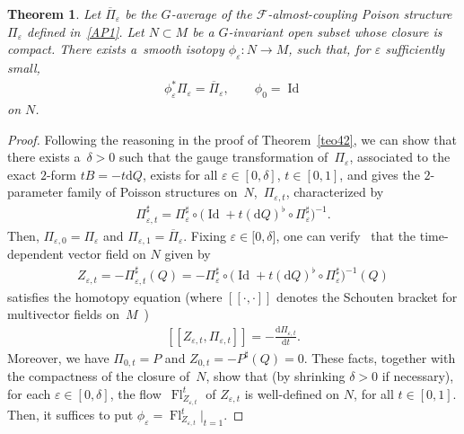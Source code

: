 \documentclass[pdftex]{sigma}
\numberwithin{equation}{section}
\newtheorem{Theorem}{Theorem}[section]
\begin{document}
\begin{Theorem}\label{teo43}
Let $\overline{\Pi}_{\varepsilon}$ be the $G$-average of the $\mathcal{F}$-almost-coupling Poison structure $\Pi_{\varepsilon}$ defined in~\eqref{AP1}. Let $N\subset M$ be a $G$-invariant open subset whose closure is compact. There exists a~smooth isotopy $\phi_{\varepsilon}\colon N\rightarrow M$, such that, for $\varepsilon$ sufficiently small,
\begin{gather*}
\phi_{\varepsilon}^{\ast}\Pi_{\varepsilon}=\overline{\Pi}_{\varepsilon},\qquad \phi_{0}=\operatorname*{Id}
\end{gather*}
on $N$.
\end{Theorem}

\begin{proof} Following the reasoning in the proof of Theorem~\ref{teo42}, we can show that there exists a~$\delta>0$ such that the gauge transformation of~$\Pi_{\varepsilon}$, associated to the exact $2$-form $tB=-t\mathrm{d}Q$, exists for all $\varepsilon \in [0,\delta]$, $t\in [0,1]$, and gives the $2$-parameter family of Poisson structures on~$N$,~$\Pi_{\varepsilon,t}$, characterized by
\begin{gather}\label{PE}
\Pi^\sharp_{\varepsilon,t}=\Pi_{\varepsilon}^{\sharp}\circ\big(\operatorname{Id}+t(\mathrm{d}Q)^{\flat}\circ\Pi_{\varepsilon}^{\sharp}\big)^{-1}.
\end{gather}
Then, $\Pi_{\varepsilon,0}=\Pi_{\varepsilon}$ and $\Pi_{\varepsilon,1} =\overline{\Pi}_{\varepsilon}$. Fixing $\varepsilon\in\lbrack0,\delta]$, one can verify~\cite{FrMa13,JVYV-14} that the time-dependent vector f\/ield on $N$ given by
\begin{gather}\label{He1}
Z_{\varepsilon,t}=-\Pi_{\varepsilon,t}^{\sharp}(Q)=-\Pi_{\varepsilon}^{\sharp} \circ\big(\operatorname{Id}+t(\mathrm{d}Q)^{\flat}\circ\Pi_{\varepsilon}^{\sharp}\big)^{-1}(Q)
\end{gather}
satisf\/ies the homotopy equation (where $[\![\cdot ,\cdot ]\!]$ denotes the Schouten bracket for multivector f\/ields on~$M$~\cite{Va-94})
\begin{gather}\label{He2}%
[\![ Z_{\varepsilon,t},\Pi_{\varepsilon,t}]\!]= -\frac{\mathrm{d}\Pi_{\varepsilon,t}}{\mathrm{d}t}.
\end{gather}
Moreover, we have $\Pi_{0,t}=P$ and $Z_{0,t}=-P^{\sharp}(Q)=0$. These facts, together with the compactness of the closure of~$N$, show that (by shrinking $\delta >0$ if necessary), for each $\varepsilon\in [0,\delta]$, the f\/low~$\operatorname*{Fl}_{Z_{\varepsilon,t}}^{t}$ of $Z_{\varepsilon,t}$ is well-def\/ined on $N$, for all $t\in [0,1]$. Then, it suf\/f\/ices to put $\phi_{\varepsilon}= \operatorname*{Fl}_{Z_{\varepsilon,t}}^{t}|_{t=1}$.
\end{proof}
\end{document}
